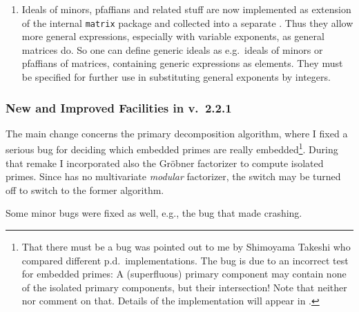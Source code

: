 \begin{enumerate}
\item Ideals of minors, pfaffians and related stuff are now
implemented as extension of the internal \texttt{matrix} package and
collected into a separate . Thus they allow more
general expressions, especially with variable exponents, as general
\REDUCE matrices do. So one can define generic ideals as e.g.\ ideals
of minors or pfaffians of matrices, containing generic expressions as
elements. They must be specified for further use in  substituting
general exponents by integers.

\end{enumerate}

\subsubsection{New and Improved Facilities in v.~2.2.1\label{221}}

The main change concerns the primary decomposition algorithm, where I
fixed a serious bug for deciding which embedded primes are really
embedded\footnote{That there must be a bug was pointed out to me by
Shimoyama Takeshi who compared different p.d.\ implementations. The
bug is due to an incorrect test for embedded primes: A (superfluous)
primary component may contain none of the isolated primary components,
but their intersection! Note that neither \cite{Gianni:88} nor \cite{Becker:93}
comment on that. Details of the implementation will appear in
\cite{Graebe:97}.}. During that remake I incorporated also the Gr\"obner
factorizer to compute isolated primes. Since \REDUCE has no
multivariate \emph{modular} factorizer, the switch 
may be turned off to switch to the former algorithm.

Some minor bugs were fixed as well, e.g., the bug that made 
crashing.

